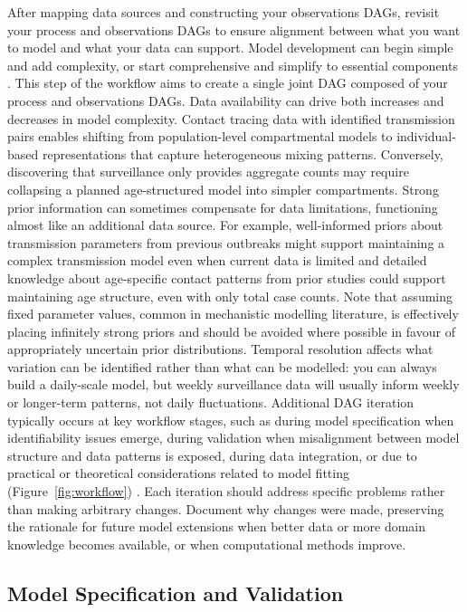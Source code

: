 \documentclass{article}
\begin{document}
After mapping data sources and constructing your observations DAGs, revisit your process and observations DAGs to ensure alignment between what you want to model and what your data can support.
Model development can begin simple and add complexity, or start comprehensive and simplify to essential components \citep{gelman2020bayesian}.
This step of the workflow aims to create a single joint DAG composed of your process and observations DAGs.
Data availability can drive both increases and decreases in model complexity.
Contact tracing data with identified transmission pairs enables shifting from population-level compartmental models to individual-based representations that capture heterogeneous mixing patterns.
Conversely, discovering that surveillance only provides aggregate counts may require collapsing a planned age-structured model into simpler compartments.
Strong prior information can sometimes compensate for data limitations, functioning almost like an additional data source.
For example, well-informed priors about transmission parameters from previous outbreaks might support maintaining a complex transmission model even when current data is limited and detailed knowledge about age-specific contact patterns from prior studies could support maintaining age structure, even with only total case counts.
Note that assuming fixed parameter values, common in mechanistic modelling literature, is effectively placing infinitely strong priors and should be avoided where possible in favour of appropriately uncertain prior distributions.
Temporal resolution affects what variation can be identified rather than what can be modelled: you can always build a daily-scale model, but weekly surveillance data will usually inform weekly or longer-term patterns, not daily fluctuations.
Additional DAG iteration typically occurs at key workflow stages, such as during model specification when identifiability issues emerge, during validation when misalignment between model structure and data patterns is exposed, during data integration, or due to practical or theoretical considerations related to model fitting (Figure~\ref{fig:workflow}) \citep{corbella2022inferring}.
Each iteration should address specific problems rather than making arbitrary changes.
Document why changes were made, preserving the rationale for future model extensions when better data or   more domain knowledge becomes available, or when computational methods improve.

\subsection{Model Specification and Validation}\label{sec:spec-validate}
\end{document}

